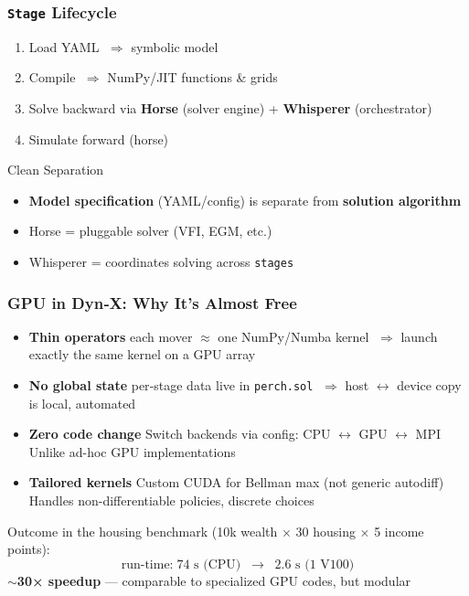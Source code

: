 \documentclass[10pt]{beamer}
\begin{document}
\begin{frame}
  \frametitle{\texttt{Stage} Lifecycle}
  
  \begin{enumerate}\itemsep3pt
    \item Load YAML $\;\Rightarrow$ symbolic model
    \item Compile $\;\Rightarrow$ NumPy/JIT functions \& grids
    \item Solve backward via \textbf{Horse} (solver engine) + \textbf{Whisperer} (orchestrator)
    \item Simulate forward (horse)
  \end{enumerate}
  \vspace{0.5em}
  \begin{block}{Clean Separation}
    \begin{itemize}
      \item \textbf{Model specification} (YAML/config) is separate from \textbf{solution algorithm}
      \item Horse = pluggable solver (VFI, EGM, etc.)
      \item Whisperer = coordinates solving across \texttt{stages}
    \end{itemize}
  \end{block}
\end{frame}

\begin{frame}
  \frametitle{GPU in Dyn‑X: Why It's Almost Free}

  \begin{itemize}\setlength\itemsep{4pt}
    \item \textbf{Thin operators}  
          each mover $\approx$ one NumPy/Numba kernel  
          $\;\Rightarrow$ launch exactly the same kernel on a GPU array
    \item \textbf{No global state}  
          per‑stage data live in \lstinline|perch.sol|  
          $\;\Rightarrow$ host $\leftrightarrow$ device copy is local, automated
    \item \textbf{Zero code change}  
          Switch backends via config: CPU $\leftrightarrow$ GPU $\leftrightarrow$ MPI\\
          Unlike ad-hoc GPU implementations
    \item \textbf{Tailored kernels}  
          Custom CUDA for Bellman max (not generic autodiff)\\
          Handles non-differentiable policies, discrete choices
  \end{itemize}

  \vspace{0.6em}
  Outcome in the housing benchmark  
  {\small(10k wealth × 30 housing × 5 income points):}
  \[
    \text{run‑time:}\; 74\text{ s (CPU)} \;\;\to\;\; 2.6\text{ s (1 V100)}
  \]
  \textbf{$\sim$30× speedup} — comparable to specialized GPU codes, but modular
\end{frame}
\end{document}
